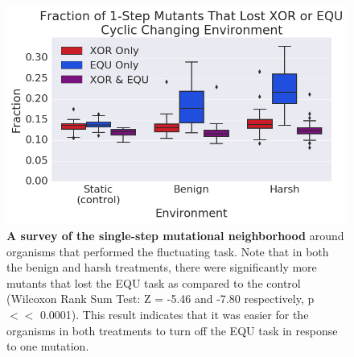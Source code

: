 \documentclass[PhD]{msu-thesis}
\begin{document}
	\begin{figure}[!h] %
	\includegraphics[trim={0.2cm 0 0 0.2cm},clip,width=0.75\columnwidth]{figures/CE/CCE_frac_1step__box.png}
	\caption{\textbf{A survey of the single-step mutational neighborhood} around organisms that performed the fluctuating task. Note that in both the benign and harsh treatments, there were significantly more mutants that lost the EQU task as compared to the control (Wilcoxon Rank Sum Test: Z = -5.46 and -7.80 respectively, p $<<$ 0.0001). This result indicates that it was easier for the organisms in both treatments to turn off the EQU task in response to one mutation. 
	}\label{fig:CCE_single_step}

	\end{figure}
\end{document}
